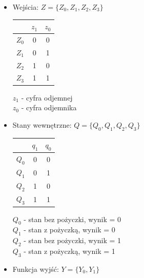 \documentclass[12pt,a4paper]{article}
\begin{document}
			\begin{itemize}
				\item Wejścia: \(Z = \{Z_0, Z_1, Z_2, Z_3\}\)\\
				
				\begin{minipage}{{.5\textwidth}}
					\centering
					\begin{tabular}{r|cc}
						&	\(z_1\)	&	\(z_0\)\\\hline
						\(Z_0\)	&	0	&	0	\\
						\(Z_1\)	&	0	&	1	\\
						\(Z_2\)	&	1	&	0	\\
						\(Z_3\)	&	1	&	1	\\
					\end{tabular}
				\end{minipage}%
				\begin{minipage}{{.5\textwidth}}
					\(z_1\) - cyfra odjemnej\\
					\(z_0\) - cyfra odjemnika
				\end{minipage}
			
				\item Stany wewnętrzne: \(Q =\{Q_0, Q_1, Q_2, Q_3\}\)\\
					
					\begin{minipage}{{.5\textwidth}}
						\centering
						\begin{tabular}{r|cc}
							&	\(q_1\)	&	\(q_0\)\\\hline
							\(Q_0\)	&	0	&	0	\\
							\(Q_1\)	&	0	&	1	\\
							\(Q_2\)	&	1	&	0	\\
							\(Q_3\)	&	1	&	1	\\
						\end{tabular}
					\end{minipage}%
					\begin{minipage}{{.5\textwidth}}	
						\(Q_0\) - stan bez pożyczki, wynik = 0\\
						\(Q_1\) - stan z pożyczką, wynik = 0\\
						\(Q_2\) - stan bez pożyczki, wynik = 1\\
						\(Q_3\) - stan z pożyczką, wynik = 1
					\end{minipage}
				
				\item Funkcja wyjść: \(Y=\{Y_0, Y_1\}\)\\
				

\end{itemize}
\end{document}
